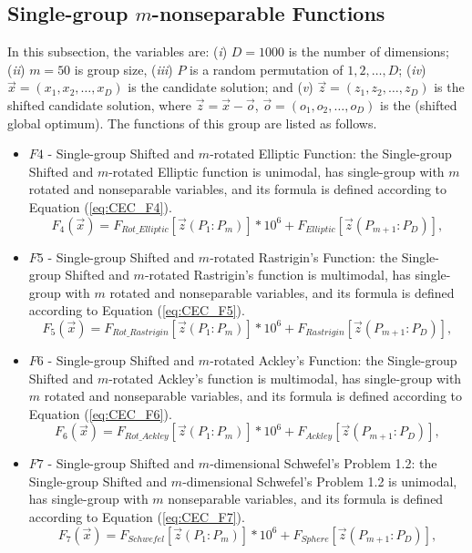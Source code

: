 \subsection{Single-group $m$-nonseparable Functions}
In this subsection, the variables are: (\emph{i}) $D = 1000$ is the number of dimensions; (\emph{ii}) $m = 50$ is group size, (\emph{iii}) $P$ is a random permutation of ${1, 2, \ldots, D}$; (\emph{iv}) $\vec{x} = (x_1, x_2, \ldots, x_D)$ is the candidate solution; and  (\emph{v}) $\vec{z} = (z_1, z_2, \ldots, z_D)$ is the shifted candidate solution, where $\vec{z} = \vec{x} - \vec{o}$, $\vec{o} = (o_1, o_2, \ldots, o_D)$ is the (shifted global optimum). The functions of this group are listed as follows.
 \begin{itemize}
   \item $F4$ - Single-group Shifted and $m$-rotated Elliptic Function: the Single-group Shifted and $m$-rotated Elliptic function is unimodal, has single-group with $m$ rotated and nonseparable variables, and its formula is defined according to Equation (\ref{eq:CEC_F4}).
        \begin{equation}\label{eq:CEC_F4}
            F_4(\vec{x}) = F_{Rot\_{Elliptic}}[\vec{z}(P_1:P_m)] \ast 10^6 + F_{Elliptic}[\vec{z}(P_{m+1}:P_D)],
        \end{equation}
   \item $F5$ - Single-group Shifted and $m$-rotated Rastrigin's Function: the Single-group Shifted and $m$-rotated Rastrigin's function is multimodal, has single-group with $m$ rotated and nonseparable variables, and its formula is defined according to Equation (\ref{eq:CEC_F5}).
        \begin{equation}\label{eq:CEC_F5}
            F_5(\vec{x}) = F_{Rot\_{Rastrigin}}[\vec{z}(P_1:P_m)] \ast 10^6 + F_{Rastrigin}[\vec{z}(P_{m+1}:P_D)],
        \end{equation}

   \item $F6$ - Single-group Shifted and $m$-rotated Ackley's Function: the Single-group Shifted and $m$-rotated Ackley's function is multimodal, has single-group with $m$ rotated and nonseparable variables, and its formula is defined according to Equation (\ref{eq:CEC_F6}).
        \begin{equation}\label{eq:CEC_F6}
            F_6(\vec{x}) = F_{Rot\_{Ackley}}[\vec{z}(P_1:P_m)] \ast 10^6 + F_{Ackley}[\vec{z}(P_{m+1}:P_D)],
        \end{equation}

   \item $F7$ - Single-group Shifted and $m$-dimensional Schwefel's Problem 1.2: the Single-group Shifted and $m$-dimensional Schwefel's Problem 1.2 is unimodal, has single-group with $m$ nonseparable variables, and its formula is defined according to Equation (\ref{eq:CEC_F7}).
        \begin{equation}\label{eq:CEC_F7}
            F_7(\vec{x}) = F_{Schwefel}[\vec{z}(P_1:P_m)] \ast 10^6 + F_{Sphere}[\vec{z}(P_{m+1}:P_D)],
        \end{equation}


\end{itemize}
